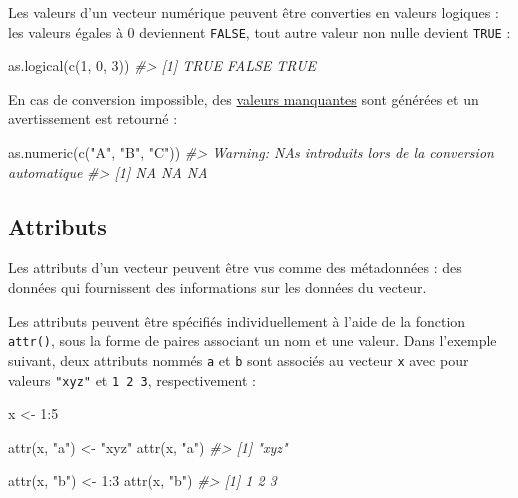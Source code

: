 \documentclass[
  french,
]{scrbook}
\newenvironment{Shaded}{\begin{snugshade}}{\end{snugshade}}
\newcommand{\CommentTok}[1]{\textcolor[rgb]{0.56,0.35,0.01}{\textit{#1}}}
\newcommand{\DecValTok}[1]{\textcolor[rgb]{0.00,0.00,0.81}{#1}}
\newcommand{\FunctionTok}[1]{\textcolor[rgb]{0.00,0.00,0.00}{#1}}
\newcommand{\NormalTok}[1]{#1}
\newcommand{\OtherTok}[1]{\textcolor[rgb]{0.56,0.35,0.01}{#1}}
\newcommand{\SpecialCharTok}[1]{\textcolor[rgb]{0.00,0.00,0.00}{#1}}
\newcommand{\StringTok}[1]{\textcolor[rgb]{0.31,0.60,0.02}{#1}}
\begin{document}
Les valeurs d'un vecteur numérique peuvent être converties en valeurs logiques : les valeurs égales à 0 deviennent \texttt{FALSE}, tout autre valeur non nulle devient \texttt{TRUE} :

\begin{Shaded}
\begin{Highlighting}[]
\FunctionTok{as.logical}\NormalTok{(}\FunctionTok{c}\NormalTok{(}\DecValTok{1}\NormalTok{, }\DecValTok{0}\NormalTok{, }\DecValTok{3}\NormalTok{))}
\CommentTok{\#\textgreater{} [1]  TRUE FALSE  TRUE}
\end{Highlighting}
\end{Shaded}

En cas de conversion impossible, des \protect\hyperlink{valeurs-manquantes}{valeurs manquantes} sont générées et un avertissement est retourné :

\begin{Shaded}
\begin{Highlighting}[]
\FunctionTok{as.numeric}\NormalTok{(}\FunctionTok{c}\NormalTok{(}\StringTok{"A"}\NormalTok{, }\StringTok{"B"}\NormalTok{, }\StringTok{"C"}\NormalTok{))}
\CommentTok{\#\textgreater{} Warning: NAs introduits lors de la conversion automatique}
\CommentTok{\#\textgreater{} [1] NA NA NA}
\end{Highlighting}
\end{Shaded}

\hypertarget{attributs}{%
\subsection{Attributs}\label{attributs}}

Les attributs d'un vecteur peuvent être vus comme des métadonnées : des données qui fournissent des informations sur les données du vecteur.

Les attributs peuvent être spécifiés individuellement à l'aide de la fonction \texttt{attr()}, sous la forme de paires associant un nom et une valeur. Dans l'exemple suivant, deux attributs nommés \texttt{a} et \texttt{b} sont associés au vecteur \texttt{x} avec pour valeurs \texttt{"xyz"} et \texttt{1\ 2\ 3}, respectivement :

\begin{Shaded}
\begin{Highlighting}[]
\NormalTok{x }\OtherTok{\textless{}{-}} \DecValTok{1}\SpecialCharTok{:}\DecValTok{5}

\FunctionTok{attr}\NormalTok{(x, }\StringTok{"a"}\NormalTok{) }\OtherTok{\textless{}{-}} \StringTok{"xyz"}
\FunctionTok{attr}\NormalTok{(x, }\StringTok{"a"}\NormalTok{)}
\CommentTok{\#\textgreater{} [1] "xyz"}

\FunctionTok{attr}\NormalTok{(x, }\StringTok{"b"}\NormalTok{) }\OtherTok{\textless{}{-}} \DecValTok{1}\SpecialCharTok{:}\DecValTok{3}
\FunctionTok{attr}\NormalTok{(x, }\StringTok{"b"}\NormalTok{)}
\CommentTok{\#\textgreater{} [1] 1 2 3}
\end{Highlighting}
\end{Shaded}
\end{document}
